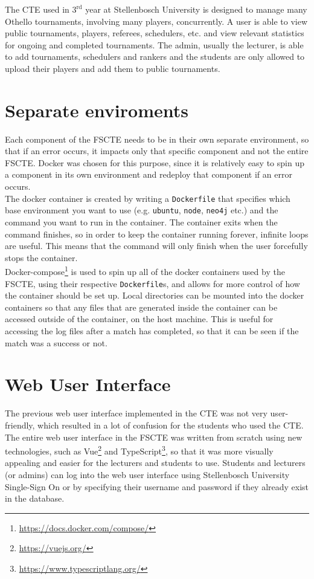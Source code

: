 \documentclass[a4paper, 11pt]{report}
\begin{document}
The CTE used in $3^{\text{rd}}$ year at Stellenbosch
University is designed to manage many Othello \cite{othello} tournaments,
involving many players, concurrently. A user is able to view public tournaments,
players, referees, schedulers, etc. and view relevant statistics for
ongoing and completed tournaments. The admin, usually the lecturer, is
able to add tournaments, schedulers and rankers and the students are only allowed
to upload their players and add them to public tournaments.

\section{Separate enviroments}

Each component of the FSCTE needs to be in their own separate environment, so that
if an error occurs, it impacts only that specific component and not the entire
FSCTE. Docker was chosen for this purpose, since it is relatively easy to spin
up a component in its own environment and redeploy that component if an error
occurs. \\

The docker container is created by writing a \texttt{Dockerfile} that
specifies which base environment you want to use (e.g. \texttt{ubuntu},
\texttt{node}, \texttt{neo4j} etc.) and the command you want to run in the
container. The container exits when the command finishes, so in order to keep
the container running forever, infinite loops are useful. This means that the
command will only finish when the user forcefully stops the container. \\

Docker-compose\footnote{\url{https://docs.docker.com/compose/}} is used to spin
up all of the docker containers used by the FSCTE,
using their respective \texttt{Dockerfile}s, and allows for more control of how
the container should be set up. Local directories can be mounted into the docker
containers so that any files that are generated inside the container can be
accessed outside of the container, on the host machine. This is useful for
accessing the log files after a match has completed, so that it can be seen if
the match was a success or not.

\section{Web User Interface}

The previous web user interface implemented in the CTE was not very user-friendly,
which resulted in a lot of confusion for the students who used the CTE. The entire
web user interface in the FSCTE was written from scratch using new technologies,
such as Vue\footnote{\url{https://vuejs.org/}} and
TypeScript\footnote{\url{https://www.typescriptlang.org/}}, so that it was more
visually appealing and easier for the lecturers and students to use. Students
and lecturers (or admins) can log into the web user interface using Stellenbosch
University Single-Sign On or by specifying their username and password if they
already exist in the database. \\
\end{document}
